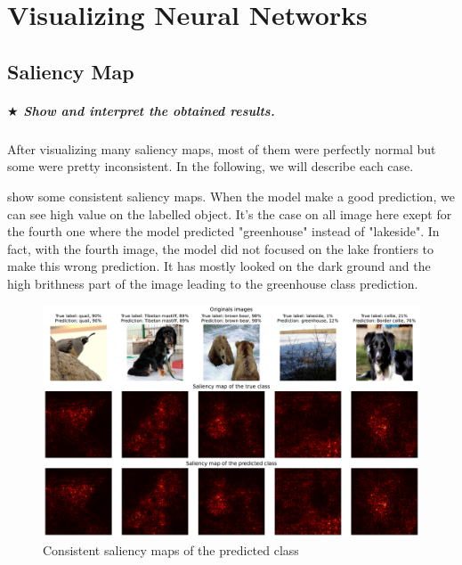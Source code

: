 \chapter{Visualizing Neural Networks}


\section{Saliency Map}
\paragraph*{$ \bigstar $ Show and interpret the obtained results.}
After visualizing many saliency maps, most of them were perfectly normal but some were pretty inconsistent. In the following, we will describe each case.


 show some consistent saliency maps. When the model make a good prediction, we can see high value on the labelled object. It's the case on all image here exept for the fourth one where the model predicted "greenhouse" instead of "lakeside". In fact, with the fourth image, the model did not focused on the lake frontiers to make this wrong prediction. It has mostly looked on the dark ground and the high brithness part of the image leading to the greenhouse class prediction.
\begin{figure}[H]
    \centering
    \includegraphics[width=.95\textwidth]{figs/2b/good_saliency_map.pdf}
    \caption{Consistent saliency maps of the predicted class}
    \label{fig:good_saliency_map}
\end{figure}


